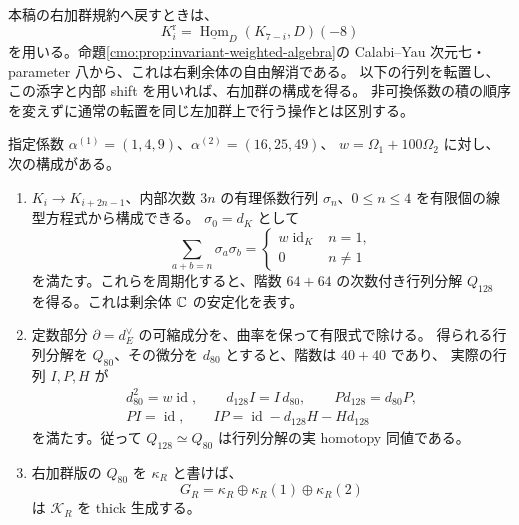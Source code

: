 本稿の右加群規約へ戻すときは、
\begin{equation}\label{cmo:eq:curved-right-dual}
 K_i^{\mathrm r}=\underline{\operatorname{Hom}}_D(K_{7-i},D)(-8)
\end{equation}
を用いる。命題\ref{cmo:prop:invariant-weighted-algebra}の
Calabi--Yau 次元七・parameter 八から、これは右剰余体の自由解消である。
以下の行列を転置し、この添字と内部 shift を用いれば、右加群の構成を得る。
非可換係数の積の順序を変えずに通常の転置を同じ左加群上で行う操作とは区別する。

\begin{theorem}[固定値の実行列分解と有限曲率縮約]
\label{cmo:thm:finite-curved-invariant-model}
指定係数 $\alpha^{(1)}=(1,4,9)$、$\alpha^{(2)}=(16,25,49)$、
$w=\Omega_1+100\Omega_2$ に対し、次の構成がある。
\begin{enumerate}
 \item $K_i\to K_{i+2n-1}$、内部次数 $3n$ の有理係数行列
 $\sigma_n$、$0\le n\le4$ を有限個の線型方程式から構成できる。
 $\sigma_0=d_K$ として
 \begin{equation}\label{cmo:eq:curved-shamash-identities}
  \sum_{a+b=n}\sigma_a\sigma_b=
  \begin{cases}w\operatorname{id}_K&n=1,\\0&n\ne1\end{cases}
 \end{equation}
 を満たす。これらを周期化すると、階数 $64+64$ の次数付き行列分解
 $Q_{128}$ を得る。これは剰余体 $\mathbb C$ の安定化を表す。
 \item 定数部分 $\partial=d_E^\vee$ の可縮成分を、曲率を保って有限式で除ける。
 得られる行列分解を $Q_{80}$、その微分を $d_{80}$ とすると、階数は $40+40$ であり、
 実際の行列 $I,P,H$ が
 \begin{equation}\label{cmo:eq:curved-contraction-identities}
 \begin{gathered}
 d_{80}^2=w\operatorname{id},\qquad d_{128}I=I\,d_{80},\qquad
 Pd_{128}=d_{80}P,\\
 PI=\operatorname{id},\qquad
 IP=\operatorname{id}-d_{128}H-Hd_{128}
 \end{gathered}
 \end{equation}
 を満たす。従って $Q_{128}\simeq Q_{80}$ は行列分解の実 homotopy 同値である。
 \item 右加群版の $Q_{80}$ を $\kappa_R$ と書けば、
 \begin{equation}\label{cmo:eq:curved-invariant-generator}
  G_R=\kappa_R\oplus\kappa_R(1)\oplus\kappa_R(2)
 \end{equation}
 は $\mathcal K_R$ を thick 生成する。
 \end{enumerate}
\end{theorem}

